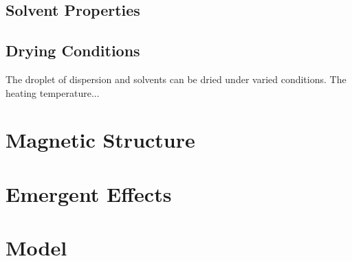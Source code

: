 \documentclass[\main/dresen_thesis.tex]{subfiles}
\renewcommand{\thisPath}{\main/chapters/monolayers}
\begin{document}
      \subsection{Solvent Properties}
        
        

      \subsection{Drying Conditions}
        The droplet of dispersion and solvents can be dried under varied conditions.
        The heating temperature...

    \section{Magnetic Structure}

    \section{Emergent Effects}

    \section{Model}
\end{document}
